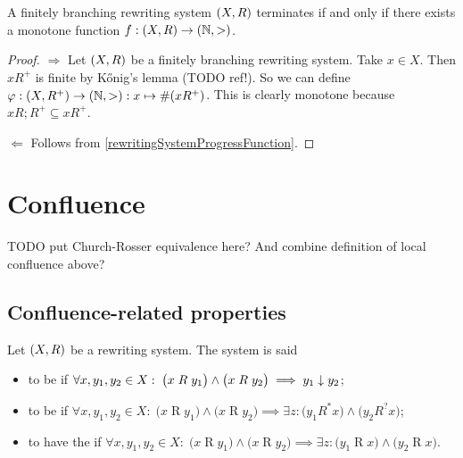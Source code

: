 \begin{lemma}
A finitely branching rewriting system $\left( X,R \right)$ terminates \textup{if and only if} there exists a monotone function $f: \left( X,R \right) \to \left( \mathbb{N},> \right)$.
\end{lemma}
\begin{proof}
$\boxed{\Rightarrow}$ Let $\left( X,R \right)$ be a finitely branching rewriting system. Take $x\in X$. Then $xR^+$ is finite by Kőnig's lemma (TODO ref!). So we can define $\varphi: \left( X, R^+ \right)\to \left( \mathbb{N}, > \right): x\mapsto \#(xR^+)$. This is clearly monotone because $xR;R^+ \subseteq xR^+$.

$\boxed{\Leftarrow}$ Follows from \ref{rewritingSystemProgressFunction}.
\end{proof}

\section{Confluence}
TODO put Church-Rosser equivalence here? And combine definition of local confluence above?
\subsection{Confluence-related properties}
\begin{definition}
Let $\left( X,R \right)$ be a rewriting system. The system is said
\begin{itemize}
\item to be  if 
$\forall x,y_1, y_2\in X: \; \big(x\mathrel{R}y_1\big) \land \big(x\mathrel{R}y_2\big) \implies y_1 \mathrel{\downarrow} y_2$;
\item to be  if $\forall x,y_1, y_2\in X: \; \big(x\mathrel{R}y_1\big) \land \big(x\mathrel{R}y_2\big) \implies \exists z:  \big(y_1 \mathrel{R^*}x\big) \land \big(y_2\mathrel{R^?}x\big)$;
\item to have the  if $\forall x,y_1, y_2\in X: \; \big(x\mathrel{R}y_1\big) \land \big(x\mathrel{R}y_2\big) \implies \exists z: \big(y_1 \mathrel{R}x\big) \land \big(y_2\mathrel{R}x\big)$.
\end{itemize}
\end{definition}

